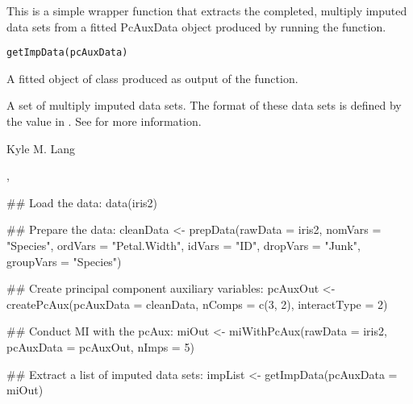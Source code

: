 \documentclass[letterpaper]{book}
\begin{document}
%
\begin{Description}\relax
This is a simple wrapper function that extracts the completed,
multiply imputed data sets from a fitted PcAuxData object produced by
running the  function.
\end{Description}
%
\begin{Usage}
\begin{verbatim}
getImpData(pcAuxData)
\end{verbatim}
\end{Usage}
%
\begin{Arguments}
\begin{ldescription}
\item[\code{pcAuxData}] 
A fitted object of class  produced as output of the
 function.

\end{ldescription}
\end{Arguments}
%
\begin{Value}
A set of multiply imputed data sets. The format of these data sets is
defined by the  value in . See
 for more information.
\end{Value}
%
\begin{Author}\relax
Kyle M. Lang
\end{Author}
%
\begin{SeeAlso}\relax
{}, 
\end{SeeAlso}
%
\begin{Examples}
\begin{ExampleCode}
## Load the data:
data(iris2)

## Prepare the data:
cleanData <- prepData(rawData   = iris2,
                      nomVars   = "Species",
                      ordVars   = "Petal.Width",
                      idVars    = "ID",
                      dropVars  = "Junk",
                      groupVars = "Species")

## Create principal component auxiliary variables:
pcAuxOut <- createPcAux(pcAuxData    = cleanData,
                        nComps       = c(3, 2),
                        interactType = 2)

## Conduct MI with the pcAux:
miOut <- miWithPcAux(rawData   = iris2,
                     pcAuxData = pcAuxOut,
                     nImps     = 5)

## Extract a list of imputed data sets:
impList <- getImpData(pcAuxData = miOut)
\end{ExampleCode}
\end{Examples}
\end{document}
